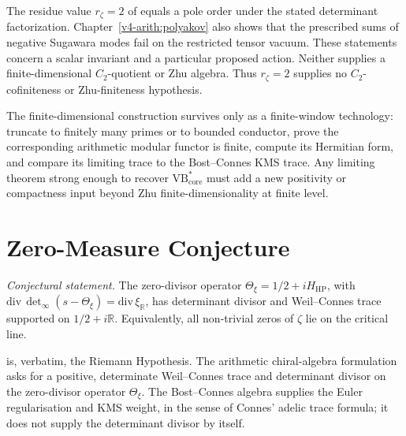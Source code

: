 \begin{remark}
\label{v4-arith:vb:rem:c-not-zhu-finite}
The residue value \(r_{\zeta}=2\) of
 equals a pole order under the stated
determinant factorization. Chapter~\ref{v4-arith:polyakov} also shows
that the prescribed sums of negative Sugawara modes fail on the
restricted tensor vacuum. These statements concern a scalar
invariant and a particular proposed action. Neither supplies a
finite-dimensional \(C_2\)-quotient or Zhu algebra. Thus
\(r_\zeta=2\) supplies no \(C_2\)-cofiniteness or Zhu-finiteness
hypothesis.
\end{remark}

\begin{remark}
\label{v4-arith:vb:rem:zhu-surviving-direction}
The finite-dimensional construction survives only as a finite-window
technology: truncate to finitely many primes or to bounded conductor,
prove the corresponding arithmetic modular functor is finite, compute
its Hermitian form, and compare its limiting trace to the
Bost--Connes KMS trace. Any limiting theorem strong enough to recover
\(\mathrm{VB}^{*}_{\mathrm{core}}\) must add a new positivity or compactness
input beyond Zhu finite-dimensionality at finite level.
\end{remark}

\section{Zero-Measure Conjecture}
\label{v4-arith:vb:open-problem}

\begin{conjecture}
\label{v4-arith:vb:conj:VB-core}
\emph{Conjectural statement.} The zero-divisor operator
\(\Theta_{\xi}=1/2+iH_{\mathrm{HP}}\), with
\(\mathrm{div}\,\det_{\infty}(s-\Theta_{\xi})=\mathrm{div}\,\xi_{\mathbb R}\),
has determinant divisor and Weil--Connes trace supported on
\(1/2+i\mathbb R\).
Equivalently, all
non-trivial zeros of \(\zeta\) lie on the critical line.
\end{conjecture}

\begin{remark}
\label{v4-arith:vb:rem:conjecture-is-RH}
 is, verbatim, the Riemann Hypothesis.
The arithmetic chiral-algebra formulation asks for a positive,
determinate Weil--Connes trace and determinant divisor on the zero-divisor operator
\(\Theta_{\xi}\). The Bost--Connes algebra supplies the Euler
regularisation and KMS weight, in the sense of Connes' adelic trace
formula; it does not supply the determinant divisor by itself.
\end{remark}

